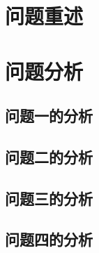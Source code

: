 \documentclass[a4paper]{cumcmthesis}
\begin{document}
\setlength{\parindent}{2em}

\begin{abstract}
摘要在各段中加粗以下三类：
（1）自创指标/模型名：货位热度指标、货格配对策略、二分图最大权匹配
（2）核心方法：遗传算法、Hungarian算法
（3）关键数值：20.98s、99.0%

注意：正文段落中不加粗任何概念名，加粗只在摘要中出现。
\end{abstract}

\section{问题重述}

\section{问题分析}
\subsection{问题一的分析}
\subsection{问题二的分析}
\subsection{问题三的分析}
\subsection{问题四的分析}
\end{document}
